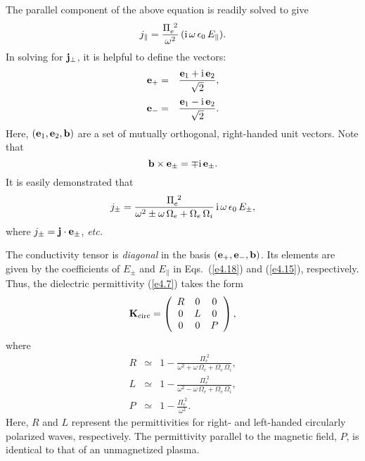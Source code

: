 The parallel component of the above equation is readily solved to give
\begin{equation}\label{e4.15}
j_\parallel = \frac{{\Pi}_e^{~2}}{\omega^2}\,({\rm i}\,\omega\,\epsilon_0\,
E_\parallel).
\end{equation}
In  solving for ${\bf j}_\perp$, it is helpful to define the
vectors:
\begin{eqnarray}
{\bf e}_+ &=& \frac{ {\bf e}_1 +{\rm i}\,{\bf e}_2}{\sqrt{2}},\\[0.5ex]
{\bf e}_- &=& \frac{ {\bf e}_1 - {\rm i}\,{\bf e}_2}{\sqrt{2}}.
\end{eqnarray}
Here, $({\bf e}_1, {\bf e}_2, {\bf b})$ are a
set of  mutually orthogonal, right-handed
unit vectors. Note that
\begin{equation}
{\bf b}\times {\bf e}_\pm  =  \mp {\rm i}\,{\bf e}_\pm.
\end{equation}
It is easily demonstrated that
\begin{equation}\label{e4.18}
j_\pm = \frac{{\Pi}_e^{~2}}
{\omega^2 \pm \omega\,{\Omega}_e
+ {\Omega}_e\,{\Omega}_i}\,{\rm i}\,\omega\,\epsilon_0\,E_\pm,
\end{equation}
where $j_\pm = {\bf j}\cdot {\bf e}_\pm$, {\em etc.}

The conductivity tensor is {\em diagonal}\/ in the basis $({\bf e}_+, {\bf e}_-,{\bf b})$. Its elements are given by the coefficients of $E_\pm$ and
$E_\parallel$ in Eqs.~(\ref{e4.18}) and (\ref{e4.15}), respectively. Thus,
the dielectric permittivity (\ref{e4.7}) takes the form
\begin{equation}
{\bf K}_{\rm circ} = \left(\begin{array}{ccc}
R&0&0\\
0&L&0\\
0&0&P\end{array}
\right),
\end{equation}
where
\begin{eqnarray}\label{e4.20a}
R &\simeq & 1 - \frac{{\Pi}_e^{~2}}
{\omega^2+\omega\,{\Omega}_e + {\Omega}_e\,{\Omega}_i},\\[0.5ex]
L&\simeq & 1 - \frac{{\Pi}_e^{~2}}
{\omega^2-\omega\,{\Omega}_e+
{\Omega}_e\,{\Omega}_i },\\[0.5ex]
P &\simeq & 1- \frac{{\Pi}_e^{~2}}{\omega^2}.\label{e4.20c}
\end{eqnarray}
Here, $R$ and $L$ represent the permittivities for right- and left-handed
circularly polarized waves, respectively. The permittivity parallel to the
magnetic field, $P$, is identical to that of an unmagnetized plasma. 

